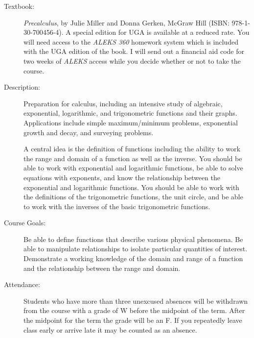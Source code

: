 \documentclass[letterpaper,11pt]{article}
\begin{document}
\begin{description}
  
\item[Textbook:] \emph{Precalculus}, by Julie Miller and Donna Gerken, McGraw
  Hill (ISBN: 978-1-30-700456-4). A special edition for UGA is available at a reduced rate. You will need access to the \emph{ALEKS 360}
  homework system which is included with the UGA edition of the
  book. I will send out a financial aid code for two weeks of \emph{ALEKS} access while you decide whether or not to take the course.

\item[Description:] Preparation for calculus, including an intensive
  study of algebraic, exponential, logarithmic, and trigonometric
  functions and their graphs. Applications include simple
  maximum/minimum problems, exponential growth and decay, and
  surveying problems.

  A central idea is the definition of functions including the ability
  to work the range and domain of a function as well as the
  inverse. You should be able to work with exponential and logarithmic
  functions, be able to solve equations with exponents, and know the
  relationship between the exponential and logarithmic functions. You
  should be able to work with the definitions of the trigonometric
  functions, the unit circle, and be able to work with the inverses of
  the basic trigonometric functions.

\item[Course Goals:] Be able to define functions that describe various
  physical phenomena. Be able to manipulate relationships to isolate
  particular quantities of interest. Demonstrate a working knowledge
  of the domain and range of a function and the relationship between
  the range and domain.

  
\item[Attendance:] Students who have more than three unexcused absences
  will be withdrawn from the course with a grade of W before the
  midpoint of the term. After the midpoint for the term the grade will
  be an F. If you repeatedly leave class early or
  arrive late it may be counted as an absence. 


\end{description}
\end{document}
